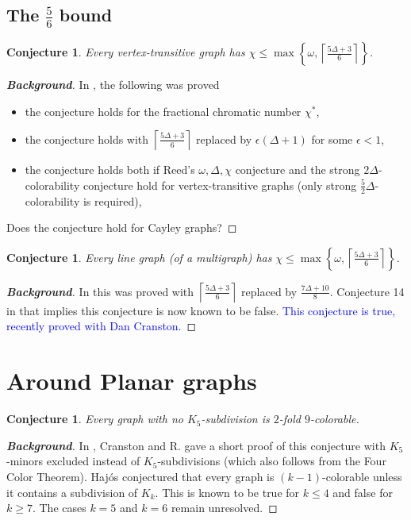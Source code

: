 \documentclass[12pt]{article}
\theoremstyle{plain}
\newtheorem{conjecture}[thm]{Conjecture}
\theoremstyle{definition}
\theoremstyle{remark}
\newcommand{\set}[1]{\left\{ #1 \right\}}
\newcommand{\ceil}[1]{\left\lceil#1\right\rceil}
\begin{document}
\subsection{The $\frac56$ bound}
\begin{conjecture}
Every vertex-transitive graph has $\chi \le \max \set{\omega, \ceil{\frac{5\Delta + 3}{6}}}$.
\end{conjecture}
\begin{proof}[\textbf{Background}]
In \cite{vertextransitive}, the following was proved
\begin{itemize}
\item the conjecture holds for the fractional chromatic number $\chi^*$,
\item the conjecture holds with $\ceil{\frac{5\Delta + 3}{6}}$ replaced by $\epsilon(\Delta + 1)$ for some $\epsilon < 1$,
\item the conjecture holds both if Reed's $\omega, \Delta, \chi$ conjecture and the strong $2\Delta$-colorability conjecture hold for vertex-transitive graphs (only strong $\frac52\Delta$-colorability is required),
\end{itemize}
Does the conjecture hold for Cayley graphs?
\end{proof}

\begin{conjecture}
Every line graph (of a multigraph) has $\chi \le \max \set{\omega, \ceil{\frac{5\Delta + 3}{6}}}$.
\end{conjecture}
\begin{proof}[\textbf{Background}]
In \cite{rabern2011strengthening} this was proved with $\ceil{\frac{5\Delta + 3}{6}}$ replaced by $\frac{7\Delta + 10}{8}$.  
Conjecture 14 in \cite{rabern2011strengthening} that implies this conjecture is now known to be false.  \textcolor{blue}{This conjecture is true, 
recently proved with Dan Cranston.}
\end{proof}

\section{Around Planar graphs}
\begin{conjecture}
Every graph with no $K_5$-subdivision is $2$-fold $9$-colorable.
\end{conjecture}
\begin{proof}[\textbf{Background}]
In \cite{planar92}, Cranston and R. gave a short proof of this conjecture with $K_5$-minors excluded instead of $K_5$-subdivisions (which also follows from the Four Color Theorem).  Haj{\'o}s conjectured that every graph is $(k-1)$-colorable unless it contains a subdivision of
$K_k$. This is known to be true for $k \le 4$ and false for $k \ge 7$. The cases $k = 5$ and $k = 6$ remain unresolved.
\end{proof}
\end{document}
